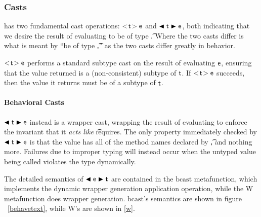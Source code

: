 \documentclass[a4paper,USenglish]{tex/lipics-v2016}
\begin{document}
\subsubsection{Casts}

\kafka has two fundamental cast operations: $\SubCast\t\e$ and $\BehCast\t\e$,
both indicating that we desire the result of evaluating \e to be of type \t.
Where the two casts differ is what is meant by ``be of type \t,'' as the two
casts differ greatly in behavior.

$\SubCast\t\e$ performs a standard subtype cast on the result of evaluating 
$\e$, ensuring that the value returned is a (non-consistent) subtype of $\t$.
If $\SubCast\t\e$ succeeds, then the value it returns must be of a subtype
of $\t$. 

\paragraph{Behavioral Casts}

$\BehCast\t\e$ instead is a wrapper cast, wrapping the result of evaluating \e
to enforce the invariant that it \emph{acts like} \t requires. The only
property immediately checked by $\BehCast\t\e$ is that the value has all of
the method names declared by \t, and nothing more. Failures due to improper
typing will instead occur when the untyped value being called violates
the type dynamically.

The detailed semantics of $\BehCast\e\t$ are contained in the $\text{bcast}$
metafunction, which implements the dynamic wrapper generation application
operation, while the $\text{W}$ metafunction does wrapper generation.
$\text{bcast}$'s semantics are shown in figure ~\ref{behavetext}, while
$\text{W}$'s are shown in \ref{w}. 
\end{document}

